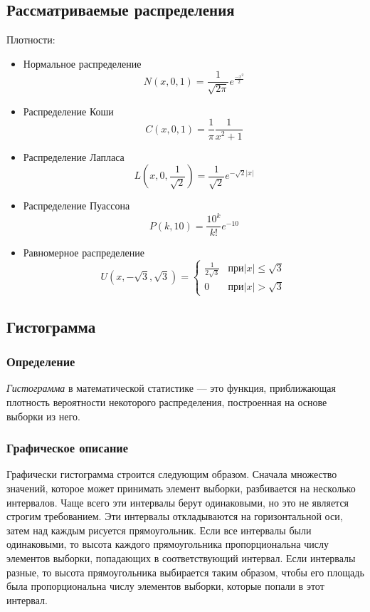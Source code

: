 \documentclass[a4paper]{article}
\begin{document}
\subsection{Рассматриваемые распределения}
\noindent Плотности:
\begin{itemize}
	\item Нормальное распределение 
	\begin{equation}\label{distr:norm} 
		N(x, 0, 1) = \frac{1}{\sqrt{2\pi}}e^{\frac{-x^2}{2}} 
	\end{equation}
	\item Распределение Коши 
	\begin{equation}\label{distr:cauchy}
		C(x, 0, 1) = \frac{1}{\pi}\frac{1}{x^2+1} 
    \end{equation} 
	\item Распределение Лапласа 
	\begin{equation}\label{distr:laplace} 
		L(x, 0, \frac{1}{\sqrt{2}}) = \frac{1}{\sqrt{2}}e^{-\sqrt{2}|x|} 
	\end{equation}
	\item Распределение Пуассона 
	\begin{equation}\label{distr:poisson}
		P(k, 10) = \frac{10^k}{k!}e^{-10}
	\end{equation}
	\item Равномерное распределение 
	\begin{equation}\label{distr:uni} 
		U(x, -\sqrt{3}, \sqrt{3}) =
		\begin{cases}
			\frac{1}{2\sqrt{3}} &\text{$при |x|\leq \sqrt{3}$}\\
			0 &\text{$при |x|>\sqrt{3}$}
		\end{cases}
	\end{equation}
	\end{itemize}

\subsection{Гистограмма}
\subsubsection{Определение}
\noindent \textit{Гистограмма} в математической статистике — это функция, приближающая плотность вероятности некоторого распределения, построенная на основе выборки из него.
	
\subsubsection{Графическое описание}
\noindent Графически гистограмма строится следующим образом. Сначала множество значений, которое может принимать элемент выборки, разбивается на несколько интервалов. Чаще всего эти интервалы берут одинаковыми, но это не является строгим требованием. Эти интервалы откладываются на горизонтальной оси, затем над каждым рисуется прямоугольник. Если все интервалы были одинаковыми, то высота каждого прямоугольника пропорциональна числу элементов выборки, попадающих в соответствующий интервал. Если интервалы разные, то высота прямоугольника выбирается таким образом, чтобы его площадь была пропорциональна числу элементов выборки, которые попали в этот интервал.
	
\end{document}
